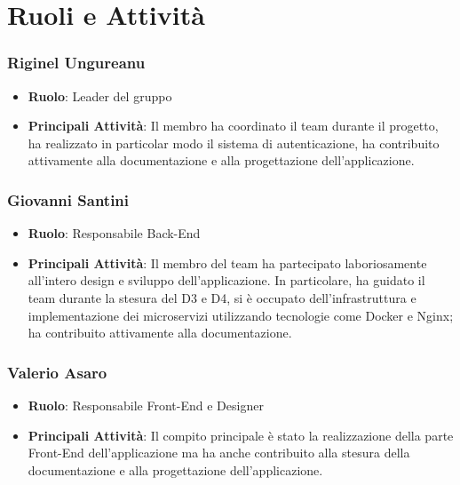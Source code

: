 \documentclass{report}
\begin{document}
\section{Ruoli e Attività}
\subsubsection{Riginel Ungureanu}
\begin{itemize}
	\item \textbf{Ruolo}: Leader del gruppo
	\item \textbf{Principali Attività}: Il membro ha coordinato il team durante il progetto, ha realizzato in particolar modo il sistema di autenticazione, ha contribuito attivamente alla documentazione e alla progettazione dell'applicazione.
\end{itemize}

\subsubsection{Giovanni Santini}
\begin{itemize}
	\item \textbf{Ruolo}: Responsabile Back-End
	\item \textbf{Principali Attività}: Il membro del team ha partecipato laboriosamente all'intero design e sviluppo dell'applicazione. In particolare, ha guidato il team durante la stesura del D3 e D4, si è occupato dell'infrastruttura e implementazione dei microservizi utilizzando tecnologie come Docker e Nginx; ha contribuito attivamente alla documentazione.
\end{itemize}


\subsubsection{Valerio Asaro}
\begin{itemize}
	\item \textbf{Ruolo}: Responsabile Front-End e Designer
	\item \textbf{Principali Attività}: Il compito principale è stato la realizzazione della parte Front-End dell'applicazione ma ha anche contribuito alla stesura della documentazione e alla progettazione dell'applicazione.
\end{itemize}
\end{document}
